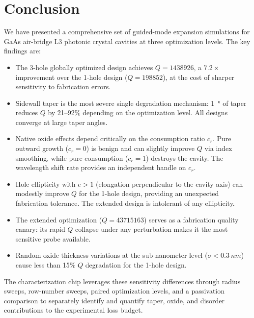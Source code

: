 \documentclass[11pt,a4paper]{article}
\begin{document}
\section{Conclusion}
\label{sec:conclusion}

We have presented a comprehensive set of guided-mode expansion simulations for GaAs air-bridge L3 photonic crystal cavities at three optimization levels. The key findings are:

\begin{itemize}
  \item The 3-hole globally optimized design achieves $Q = \num{1438926}$, a $7.2\times$ improvement over the 1-hole design ($Q = \num{198852}$), at the cost of sharper sensitivity to fabrication errors.

  \item Sidewall taper is the most severe single degradation mechanism: \SI{1}{\degree} of taper reduces $Q$ by 21--92\% depending on the optimization level. All designs converge at large taper angles.

  \item Native oxide effects depend critically on the consumption ratio $c_r$. Pure outward growth ($c_r = 0$) is benign and can slightly improve $Q$ via index smoothing, while pure consumption ($c_r = 1$) destroys the cavity. The wavelength shift rate provides an independent handle on $c_r$.

  \item Hole ellipticity with $e > 1$ (elongation perpendicular to the cavity axis) can modestly improve $Q$ for the 1-hole design, providing an unexpected fabrication tolerance. The extended design is intolerant of any ellipticity.

  \item The extended optimization ($Q = \num{43715163}$) serves as a fabrication quality canary: its rapid $Q$ collapse under any perturbation makes it the most sensitive probe available.

  \item Random oxide thickness variations at the sub-nanometer level ($\sigma < \SI{0.3}{nm}$) cause less than 15\% $Q$ degradation for the 1-hole design.
\end{itemize}

The characterization chip leverages these sensitivity differences through radius sweeps, row-number sweeps, paired optimization levels, and a passivation comparison to separately identify and quantify taper, oxide, and disorder contributions to the experimental loss budget.
\end{document}
